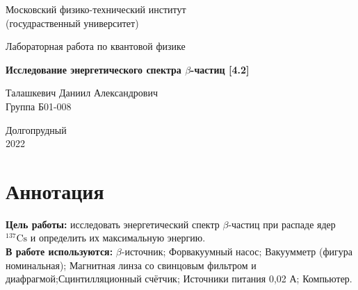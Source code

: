 \documentclass[a4paper, 12pt]{article}%
\newcommand{\isotope}[2]{$ ^{#2}\mathrm{#1} $}
\newcommand{\btt}{$\beta $}
\begin{document}


\begin{titlepage}

	\newpage
	\begin{center}
		\normalsize Московский физико-технический институт \\(госудраственный 			университет)
	\end{center}

	\vspace{6em}

	\begin{center}
		\Large Лабораторная работа по квантовой физике\\
	\end{center}

	\vspace{1em}

	\begin{center}
		\large \textbf{Исследование энергетического спектра $\beta$-частиц  [4.2]}
	\end{center}

	\vspace{2em}

	\begin{center}
		\large Талашкевич Даниил Александрович\\
		Группа Б01-008
	\end{center}

	\vspace{\fill}

	\begin{center}
	Долгопрудный \\2022
	\end{center}
	
\end{titlepage}



	\thispagestyle{empty}
	\newpage
	\tableofcontents
	\newpage
	\setcounter{page}{1}





	\section{Аннотация}
	\textbf{Цель работы:} исследовать энергетический спектр \btt-частиц при распаде ядер \isotope{Cs}{137} и определить их максимальную энергию.\\
	\textbf{В работе используются:} \btt-источник; Форвакуумный насос; Вакуумметр (фигура номинальная); Магнитная линза со свинцовым фильтром и диафрагмой;Сцинтилляционный счётчик; Источники питания 0,02 А; Компьютер.
	
\end{document}
